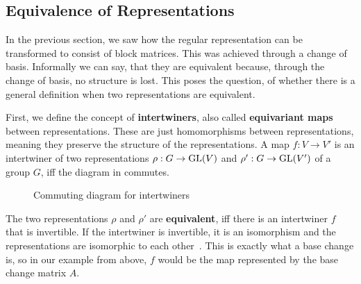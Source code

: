 \subsection{Equivalence of Representations}
\label{sec:basics.equ}

In the previous section, we saw how the regular representation can be transformed to consist of block matrices.
This was achieved through a change of basis.
Informally we can say, that they are equivalent because, through the change of basis, no structure is lost.
This poses the question, of whether there is a general definition when two representations are equivalent.

First, we define the concept of \textbf{intertwiners}, also called \textbf{equivariant maps} between representations.
These are just homomorphisms between representations, meaning they preserve the structure of the representations.
A map $f: V \to V'$ is an intertwiner of two representations $\rho: G \to \operatorname{GL}(V)$ and $\rho': G \to \operatorname{GL}(V')$ of a group $G$, iff the diagram in  commutes\cite{fuchs2003}.

\begin{figure}[h]
    \centering
    \caption{Commuting diagram for intertwiners}
    \label{fig:main.what.equ-cd}
\end{figure}

The two representations $\rho$ and $\rho'$ are \textbf{equivalent}, iff there is an intertwiner $f$ that is invertible.
If the intertwiner is invertible, it is an isomorphism and the representations are isomorphic to each other~\cite{hein2013,fuchs2003}.
This is exactly what a base change is, so in our example from above, $f$ would be the map represented by the base change matrix $A$.
